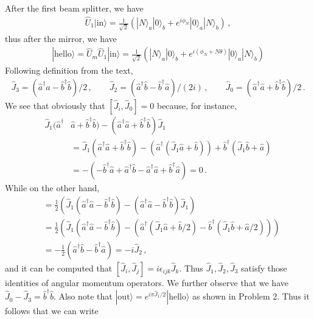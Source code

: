 \documentclass[11pt, oneside]{book}
\theoremstyle{break}
\theoremstyle{break}
\begin{document}
\chapter{}
After the first beam splitter, we have
\begin{align*}
\hat{U}_1 |\text{in}\rangle = \frac{1}{\sqrt{2}}\left( |N\rangle_a |0\rangle_b + e^{i\phi_N}|0\rangle_a | N\rangle_b \right)\,,
\end{align*}
thus after the mirror, we have
\begin{align*}
|\text{hello} \rangle= \hat{U}_m \hat{U}_1 |\text{in}\rangle = \frac{1}{\sqrt{2}} \left( |N\rangle_a | 0 \rangle_b + e^{i(\phi_N + N\theta)}|0\rangle_a |N\rangle_b\right)
\end{align*}
Following definition from the text,
\begin{align*}
\hat{J}_3 = (\hat{a}^\dagger \hat{a} - \hat{b}^\dagger \hat{b})/2 \,,\qquad \hat{J}_2 = (\hat{a}^\dagger \hat{b} - \hat{b}^\dagger \hat{a})/(2i)\,,\qquad
\hat{J}_0 = (\hat{a}^\dagger \hat{a} + \hat{b}^\dagger \hat{b})/2
\,.
\end{align*}
We see that obviously that $
[\hat{J}_i, \hat{J}_0] = 0$ because, for instance,
\begin{align*}
\hat{J}_1(\hat{a}^\dagger &\hat{a} + \hat{b}^\dagger \hat{b}) - (\hat{a}^\dagger \hat{a} + \hat{b}^\dagger \hat{b})\hat{J}_1 \\
&= \hat{J}_1(\hat{a}^\dagger \hat{a} + \hat{b}^\dagger \hat{b}) - (\hat{a}^\dagger(\hat{J}_1 \hat{a} + \hat{b}) ) + \hat{b}^\dagger(\hat{J}_1 \hat{b}+ \hat{a})\\
&= -\left( -\hat{b}^\dagger \hat{a}+ \hat{a}^\dagger\hat{b} - \hat{a}^\dagger\hat{a} + \hat{b}^\dagger \hat{a}\right) = 0 \,.
\end{align*}
While on the other hand, 
\begin{align*}
[\hat{J}_1,\hat{J}_3 ] &=\frac{1}{2}\left( 
\hat{J}_1
(\hat{a}^\dagger \hat{a} - \hat{b}^\dagger \hat{b})
-
(\hat{a}^\dagger \hat{a} - \hat{b}^\dagger \hat{b})
\hat{J}_1
\right)\\
&= \frac{1}{2}
\left( 
\hat{J}_1
(\hat{a}^\dagger \hat{a} - \hat{b}^\dagger \hat{b})
-
\left(
\hat{a}^\dagger(\hat{J}_1 \hat{a} + \hat{b}/2)-\hat{b}^\dagger (\hat{J}_1\hat{b} + \hat{a}/2)
\right) 
\right)\\
&= -\frac{1}{2}(\hat{a}^\dagger\hat{b} -\hat{b}^\dagger \hat{a} ) = -i \hat{J}_2\,,
\end{align*}
and it can be computed that $[\hat{J}_i, \hat{J}_j] =i\epsilon_{ijk} \hat{J}_k$. Thus $\hat{J}_1,\hat{J}_2,\hat{J}_3$ satisfy those identities of angular momentum operators. We further observe that we have $\hat{J}_0 - \hat{J}_3 = \hat{b}^\dagger \hat{b}$. Also note that $|\text{out}\rangle = e^{i\pi\hat{J}_1 /2} |\text{hello}\rangle$ as shown in Problem 2. Thus it follows that we can write
\end{document}
